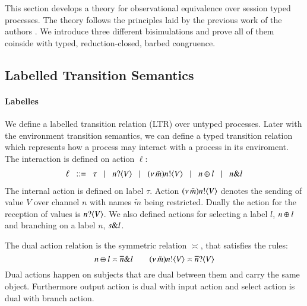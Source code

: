 \noi This section develops a theory for observational equivalence over
session typed \HOp processes. The theory follows the principles
laid by the previous work of the authors
\cite{DBLP:conf/forte/KouzapasYH11,KY13,dkphdthesis}.
We introduce three different bisimulations and prove 
all of them coinside with typed, reduction-closed,
barbed congruence. 

\subsection{Labelled Transition Semantics}\label{ss:lts}
\paragraph{Labelles}
\noi We define a labelled transition relation (LTR) over
untyped processes. Later with the environment transition semantics, 
we can define a typed transition relation which represents 
how a process may interact with a process in its enviroment. The interaction
is defined on action $\ell$:
\[
\begin{array}{l}
		\ell	\;\;::=\;\;   \tau 
		\;\;\;|\;\;\;n ? \langle V \rangle 
			\;\;\;|\;\;\; (\nu\, \tilde{m}) n ! \langle V \rangle
			\;\;\;|\;\;\;  n \oplus l 
			\;\;\;|\;\;\; n \& l 
\end{array}
\]
\noi The internal action is defined on label $\tau$.
Action $(\nu\, \tilde{m}) n ! \langle V \rangle$ denotes the sending of value $V$ over channel $n$ with
names $\tilde{m}$ being restricted.
Dually the action for the reception of values is 
$n ? \langle V \rangle$.
We also defined actions for selecting a label $l$, 
$n \oplus l$ and branching on a label
$n$, $s \& l$.

The dual action relation is the symmetric relation $\asymp$, that satisfies the rules:
\[
	n \oplus l \asymp \overline{n} \& l
	\qquad
	(\nu\, \tilde{m}) n ! \langle V \rangle \asymp \overline{n} ? \langle V \rangle
\]
Dual actions happen on subjects that are dual between them and carry the same
object. Furthermore output action is dual with input action and 
select action is dual with branch action.

